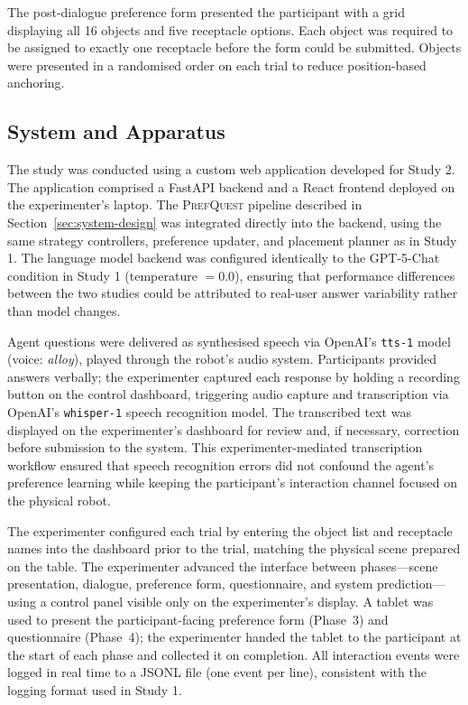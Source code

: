 \documentclass[manuscript,review,anonymous]{acmart}
\begin{document}
The post-dialogue preference form presented the participant with a grid displaying all 16 objects and five receptacle options. Each object was required to be assigned to exactly one receptacle before the form could be submitted. Objects were presented in a randomised order on each trial to reduce position-based anchoring.

\subsection{System and Apparatus}
\label{sec:study2:apparatus}

The study was conducted using a custom web application developed for Study 2. The application comprised a FastAPI backend and a React frontend deployed on the experimenter's laptop. The \textsc{PrefQuest} pipeline described in Section~\ref{sec:system-design} was integrated directly into the backend, using the same strategy controllers, preference updater, and placement planner as in Study 1. The language model backend was configured identically to the GPT-5-Chat condition in Study 1 (temperature $= 0.0$), ensuring that performance differences between the two studies could be attributed to real-user answer variability rather than model changes.

Agent questions were delivered as synthesised speech via OpenAI's \texttt{tts-1} model (voice: \textit{alloy}), played through the robot's audio system. Participants provided answers verbally; the experimenter captured each response by holding a recording button on the control dashboard, triggering audio capture and transcription via OpenAI's \texttt{whisper-1} speech recognition model. The transcribed text was displayed on the experimenter's dashboard for review and, if necessary, correction before submission to the system. This experimenter-mediated transcription workflow ensured that speech recognition errors did not confound the agent's preference learning while keeping the participant's interaction channel focused on the physical robot.

The experimenter configured each trial by entering the object list and receptacle names into the dashboard prior to the trial, matching the physical scene prepared on the table. The experimenter advanced the interface between phases---scene presentation, dialogue, preference form, questionnaire, and system prediction---using a control panel visible only on the experimenter's display. A tablet was used to present the participant-facing preference form (Phase~3) and questionnaire (Phase~4); the experimenter handed the tablet to the participant at the start of each phase and collected it on completion. All interaction events were logged in real time to a JSONL file (one event per line), consistent with the logging format used in Study 1.
\end{document}
